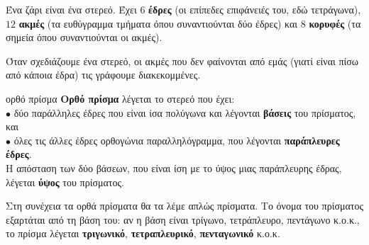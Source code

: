 

Ένα ζάρι είναι ένα στερεό. Έχει $6$ \textbf{έδρες} (οι επίπεδες επιφάνειές του, εδώ τετράγωνα), $12$ \textbf{ακμές} (τα ευθύγραμμα τμήματα όπου συναντιούνται δύο έδρες) και $8$ \textbf{κορυφές} (τα σημεία όπου συναντιούνται οι ακμές).

\begin{center}
\end{center}

Όταν σχεδιάζουμε ένα στερεό, οι ακμές που δεν φαίνονται από εμάς (γιατί είναι πίσω από κάποια έδρα) τις γράφουμε διακεκομμένες.

\begin{orismos}{ορθό πρίσμα}
\textbf{Ορθό πρίσμα} λέγεται το στερεό που έχει:\\
$\bullet$ δύο παράλληλες έδρες που είναι ίσα πολύγωνα και λέγονται \textbf{βάσεις} του πρίσματος, και\\
$\bullet$ όλες τις άλλες έδρες ορθογώνια παραλληλόγραμμα, που λέγονται \textbf{παράπλευρες έδρες}.\\
Η απόσταση των δύο βάσεων, που είναι ίση με το ύψος μιας παράπλευρης έδρας, λέγεται \textbf{ύψος} του πρίσματος.
\end{orismos}

Στη συνέχεια τα ορθά πρίσματα θα τα λέμε απλώς πρίσματα. Το όνομα του πρίσματος εξαρτάται από τη βάση του: αν η βάση είναι τρίγωνο, τετράπλευρο, πεντάγωνο κ.ο.κ., το πρίσμα λέγεται \textbf{τριγωνικό}, \textbf{τετραπλευρικό}, \textbf{πενταγωνικό} κ.ο.κ.

\begin{center}
\end{center}

